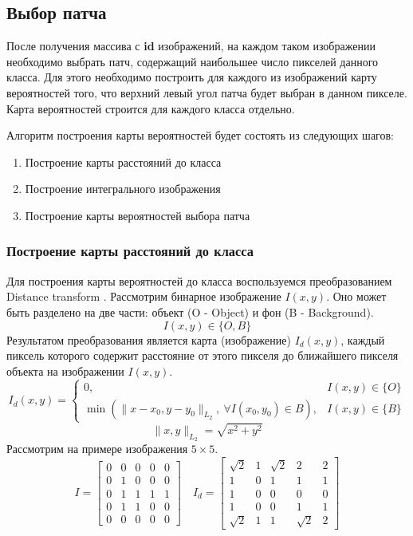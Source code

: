 \subsection{Выбор патча}
После получения массива с \textbf{id} изображений, на каждом таком изображении необходимо выбрать патч, содержащий наибольшее число пикселей данного класса. Для этого необходимо построить для каждого из изображений карту вероятностей того, что верхний левый угол патча будет выбран в данном пикселе. Карта вероятностей строится для каждого класса отдельно. \par Алгоритм построения карты вероятностей будет состоять из следующих шагов:
\begin{enumerate}
    \item Построение карты расстояний до класса
    \item Построение интегрального изображения
    \item Построение карты вероятностей выбора патча
\end{enumerate}
\subsubsection{Построение карты расстояний до класса}
Для построения карты вероятностей до класса воспользуемся преобразованием Distance transform \cite{fabbri20082d}.
Рассмотрим бинарное изображение $I(x,y)$. Оно может быть разделено на две части: объект (O - Object) и фон (B - Background).
$$
I(x, y) \in\{O, B\}
$$
Результатом преобразования является карта (изображение) $I_{d}(x,y)$, каждый пиксель которого содержит расстояние от этого пикселя до ближайшего пикселя объекта на изображении $I(x,y)$.
$$
I_{d}(x, y)=\left\{\begin{array}{ll}
0, & I(x, y) \in\{O\} \\
\min \left(\| x-x_{0}, y-y_{0} \|_{L_{2}}, \ \forall I\left(x_{0}, y_{0}\right) \in B \right), & I(x, y) \in\{B\}
\end{array}\right.
$$
$$
\|x, y\|_{L_{2}}=\sqrt{x^{2}+y^{2}}
$$
Рассмотрим на примере изображения $5 \times 5$.
$$
I = 
\begin{bmatrix}
 0&0&0&0&0 \\
 0&1&0&0&0 \\
 0&1&1&1&1 \\
 0&1&1&0&0 \\
 0&0&0&0&0
\end{bmatrix}
\quad
I_d=
\begin{bmatrix}
 \sqrt{2}&1&\sqrt{2}&2&2 \\
 1&0&1&1&1 \\
 1&0&0&0&0 \\
 1&0&0&1&1 \\
 \sqrt{2}&1&1&\sqrt{2}&2
\end{bmatrix}
$$

